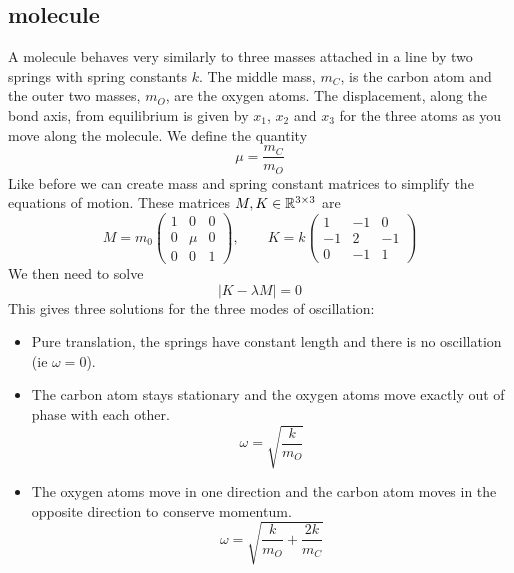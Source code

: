 \documentclass{article}
\begin{document}
    \subsection{ molecule}
    A  molecule behaves very similarly to three masses attached in a line by two springs with spring constants \(k\).
    The middle mass, \(m_C\), is the carbon atom and the outer two masses, \(m_O\), are the oxygen atoms.
    The displacement, along the bond axis, from equilibrium is given by \(x_1\), \(x_2\) and \(x_3\) for the three atoms as you move along the molecule.
    We define the quantity
    \[\mu = \frac{m_C}{m_O}\]
    Like before we can create mass and spring constant matrices to simplify the equations of motion.
    These matrices \(M, K\in\mathbb{R}^{3\times 3}\) are
    \[
        M = m_0
        \begin{pmatrix}
            1 & 0 & 0\\
            0 & \mu & 0\\
            0 & 0 & 1
        \end{pmatrix}
        ,\qquad
        K = k
        \begin{pmatrix}
            1 & -1 & 0\\
            -1 & 2 & -1\\
            0 & -1 & 1
        \end{pmatrix}
    \]
    We then need to solve
    \[|K - \lambda M| = 0\]
    This gives three solutions for the three modes of oscillation:
    \begin{itemize}
        \item Pure translation, the springs have constant length and there is no oscillation (ie \(\omega = 0\)).
        \item The carbon atom stays stationary and the oxygen atoms move exactly out of phase with each other.
        \[\omega = \sqrt{\frac{k}{m_O}}\]
        \item The oxygen atoms move in one direction and the carbon atom moves in the opposite direction to conserve momentum.
        \[\omega = \sqrt{\frac{k}{m_O} + \frac{2k}{m_C}}\]
    \end{itemize}
    
\end{document}
